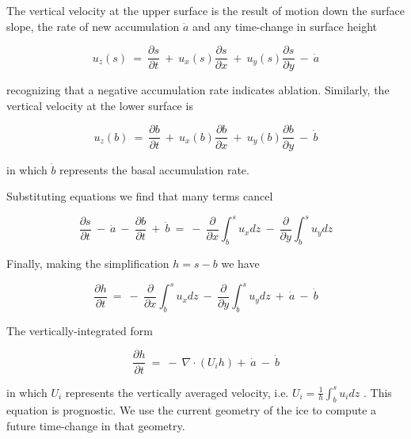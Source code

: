 The vertical velocity at the upper surface is the result of motion down
the surface slope, the rate of new accumulation $\dot{a}$ and any
time-change in surface height

\begin{equation}
u_{z} \left(s\right)~=~\frac{\partial s}{\partial t}~+~u_{x}(s)\frac{\partial s}{\partial x}~+~u_{y}(s)\frac{\partial s}{\partial y}~-~\dot{a} 
\end{equation}

recognizing that a negative accumulation rate indicates ablation.
Similarly, the vertical velocity at the lower surface is

\begin{equation}
u_{z} \left(b\right)~=~\frac{\partial b}{\partial t}~+~u_{x}(b)\frac{\partial b}{\partial x}~+~u_{y}(b)\frac{\partial b}{\partial y}~-~\dot{b} 
\end{equation}

in which $\dot{b}$ represents the basal accumulation rate.

Substituting equations we find that many terms cancel

\begin{equation}
\frac{\partial s}{\partial t}~-~\dot{a}~-~\frac{\partial b}{\partial t}~+~\dot{b}~=~-~\frac{\partial}{\partial x} \int_{b}^{s} u_{x} dz~-~\frac{\partial}{\partial y} \int_{b}^{s} u_{y} dz
\end{equation}

Finally, making the simplification $h=s-b$ we have

\begin{equation}
\frac{\partial h}{\partial t}~=~-~\frac{\partial}{\partial x} \int_{b}^{s} u_{x} dz~-~\frac{\partial}{\partial y} \int_{b}^{s} u_{y} dz ~+~\dot{a}~-~\dot{b}
\end{equation}

The vertically-integrated form

\begin{equation}
\frac{\partial h}{\partial t}~=~-~\nabla \cdot \left( U_{i} h \right) +~\dot{a}~-~\dot{b}
\end{equation}

in which $U_{i}$ represents the vertically averaged velocity, i.e.
$U_i = \frac{1}{h}\int_{b}^{s}u_{i}dz$ . This equation is prognostic. We
use the current geometry of the ice to compute a future time-change in
that geometry.
